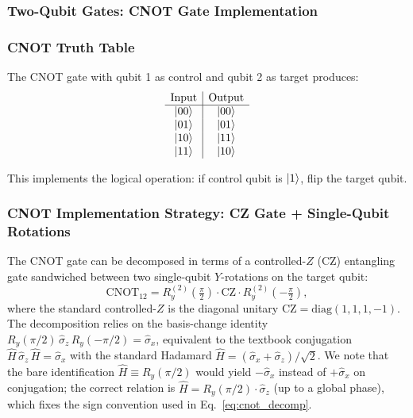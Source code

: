\subsubsection{Two-Qubit Gates: CNOT Gate Implementation}

\subsubsection{CNOT Truth Table}
The CNOT gate with qubit 1 as control and qubit 2 as target produces:
\begin{equation}
\begin{array}{c|c}
\text{Input} & \text{Output} \\
\hline
\ket{00} & \ket{00} \\
\ket{01} & \ket{01} \\
\ket{10} & \ket{11} \\
\ket{11} & \ket{10}
\end{array}
\end{equation}

This implements the logical operation: if control qubit is $\ket{1}$, flip the target qubit.

\subsubsection{CNOT Implementation Strategy: CZ Gate + Single-Qubit Rotations}

The CNOT gate can be decomposed in terms of a controlled-$Z$ (CZ) entangling gate
sandwiched between two single-qubit $Y$-rotations on the target qubit:
\begin{equation}
\text{CNOT}_{12} = R_y^{(2)}\!\left(\tfrac{\pi}{2}\right) \cdot \text{CZ} \cdot R_y^{(2)}\!\left(-\tfrac{\pi}{2}\right),
\label{eq:cnot_decomp}
\end{equation}
where the standard controlled-$Z$ is the diagonal unitary
$\text{CZ}=\mathrm{diag}(1,1,1,-1)$.
The decomposition relies on the basis-change identity
$R_y(\pi/2)\,\hat{\sigma}_z\,R_y(-\pi/2)=\hat{\sigma}_x$,
equivalent to the textbook conjugation
$\hat{H}\,\hat{\sigma}_z\,\hat{H} = \hat{\sigma}_x$ with the standard Hadamard
$\hat{H}=(\hat{\sigma}_x+\hat{\sigma}_z)/\sqrt{2}$.
We note that the bare identification $\hat{H}\equiv R_y(\pi/2)$
would yield $-\hat{\sigma}_x$ instead of $+\hat{\sigma}_x$ on conjugation;
the correct relation is $\hat{H}=R_y(\pi/2)\cdot\hat{\sigma}_z$ (up to a global
phase), which fixes the sign convention used in Eq.~\eqref{eq:cnot_decomp}.

